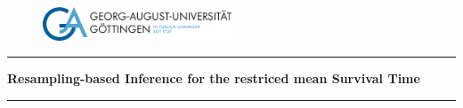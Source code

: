 
\thispagestyle{empty}

\vspace*{\fill}
\begin{center}

\begin{figure}[htbp]
  \centering
  \includegraphics[width=0.5\textwidth]{assets/uni-goe-logo.png}
\end{figure}

\rule{\linewidth}{0.5mm}

{\Large \textbf{Resampling-based Inference for the restriced mean Survival Time}}

\rule{\linewidth}{0.5mm} \\

\end{center}

\vspace*{\fill}
